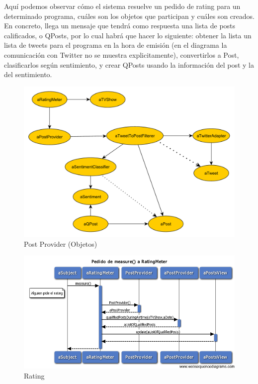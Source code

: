 Aquí podemos observar cómo el sistema resuelve un pedido de rating para un determinado programa, cuáles son los objetos que participan y cuáles son creados. En concreto, llega un mensaje que tendrá como respuesta una lista de posts calificados, o QPosts, por lo cual habrá que hacer lo siguiente: obtener la lista un lista de tweets para el programa en la hora de emisión (en el diagrama la comunicación con Twitter no se muestra explicitamente), convertirlos a Post, clasificarlos según sentimiento, y crear QPosts usando la información del post y la del sentimiento.

\begin{figure}[H]
\centering
\includegraphics[scale=0.7]{graph/objetos/PostProvider.pdf}
\caption{Post Provider (Objetos)}
\end{figure}


\begin{figure}[H]
\centering
\includegraphics[width=\textwidth]{graph/diagramas_secuencia/Rating.png}
\caption{Rating}
\end{figure}

